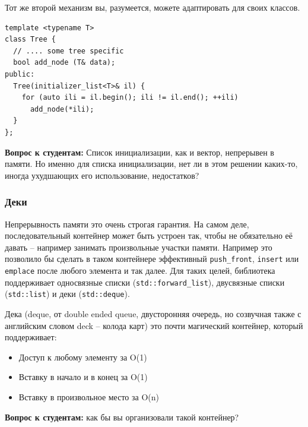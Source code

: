 \documentclass[a4paper,12pt,oneside]{article}
\newif\ifanswers
\begin{document}
Тот же второй механизм вы, разумеется, можете адаптировать для своих классов.

\begin{lstlisting}
template <typename T>
class Tree {
  // .... some tree specific
  bool add_node (T& data);
public:
  Tree(initializer_list<T>& il) {
    for (auto ili = il.begin(); ili != il.end(); ++ili)
      add_node(*ili);
  }
};
\end{lstlisting}

\textbf{Вопрос к студентам:} Список инициализации, как и вектор, непрерывен в памяти. Но именно для списка инициализации, нет ли в этом решении каких-то, иногда ухудшающих его использование, недостатков?

\ifanswers
Разумеется. Например предполагается, что список инициализации -- нормальный неинтрузивный контейнер. Он хранит копии данных и так далее. Но это означает, что если вы решите написать интрузивный контейнер, вы просто не сможете использовать для него список инициализации. Также такой инициализатор это плохая идея если копирование дорого.
\fi

\subsubsection{Деки}\label{subsub:Deque}

Непрерывность памяти это очень строгая гарантия. На самом деле, последовательный контейнер может быть устроен так, чтобы не обязательно её давать -- например занимать произвольные участки памяти. Например это позволило бы сделать в таком контейнере эффективный \lstinline!push_front!, \lstinline!insert! или \lstinline!emplace! после любого элемента и так далее. Для таких целей, библиотека поддерживает односвязные списки (\lstinline!std::forward_list!), двусвязные списки (\lstinline!std::list!) и деки (\lstinline!std::deque!).

Дека (deque, от double ended queue, двусторонняя очередь, но созвучная также с английским словом deck -- колода карт) это почти магический контейнер, который поддерживает:

\begin{itemize}
\item Доступ к любому элементу за O(1) 
\item Вставку в начало и в конец за O(1) 
\item Вставку в произвольное место за O(n)
\end{itemize}

\textbf{Вопрос к студентам:} как бы вы организовали такой контейнер?
\end{document}
